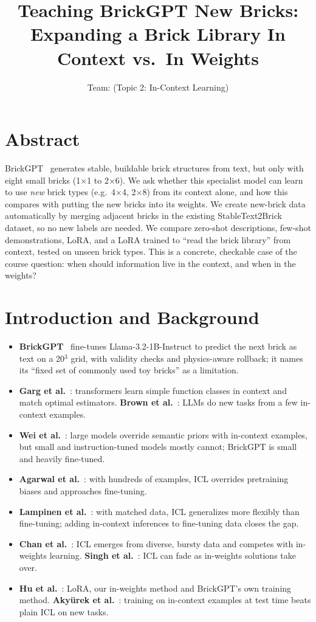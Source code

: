 \documentclass[12pt]{article}
\title{\vspace{-2cm}Teaching BrickGPT New Bricks: Expanding a Brick Library In Context vs.\ In Weights\vspace{-0.5cm}}
\author{Team: \todo{[Name 1], [Name 2], [Name 3], [Name 4]} \quad (Topic 2: In-Context Learning)}
\date{\vspace{-1.2cm}}
\begin{document}
\maketitle

\section*{Abstract}
BrickGPT~\cite{pun2025brickgpt} generates stable, buildable brick structures from text, but only with eight small bricks (1$\times$1 to 2$\times$6).
We ask whether this specialist model can learn to use \emph{new} brick types (e.g.\ 4$\times$4, 2$\times$8) from its context alone, and how this compares with putting the new bricks into its weights.
We create new-brick data automatically by merging adjacent bricks in the existing StableText2Brick dataset, so no new labels are needed.
We compare zero-shot descriptions, few-shot demonstrations, LoRA, and a LoRA trained to ``read the brick library'' from context, tested on unseen brick types.
This is a concrete, checkable case of the course question: when should information live in the context, and when in the weights?

\section*{Introduction and Background}
\begin{itemize}
\item \textbf{BrickGPT}~\cite{pun2025brickgpt} fine-tunes Llama-3.2-1B-Instruct to predict the next brick as text on a 20$^3$ grid, with validity checks and physics-aware rollback; it names its ``fixed set of commonly used toy bricks'' as a limitation.
\item \textbf{Garg et al.}~\cite{garg2022can}: transformers learn simple function classes in context and match optimal estimators. \textbf{Brown et al.}~\cite{brown2020gpt3}: LLMs do new tasks from a few in-context examples.
\item \textbf{Wei et al.}~\cite{wei2023larger}: large models override semantic priors with in-context examples, but small and instruction-tuned models mostly cannot; BrickGPT is small and heavily fine-tuned.
\item \textbf{Agarwal et al.}~\cite{agarwal2024manyshot}: with hundreds of examples, ICL overrides pretraining biases and approaches fine-tuning.
\item \textbf{Lampinen et al.}~\cite{lampinen2025generalization}: with matched data, ICL generalizes more flexibly than fine-tuning; adding in-context inferences to fine-tuning data closes the gap.
\item \textbf{Chan et al.}~\cite{chan2022data}: ICL emerges from diverse, bursty data and competes with in-weights learning. \textbf{Singh et al.}~\cite{singh2023transient}: ICL can fade as in-weights solutions take over.
\item \textbf{Hu et al.}~\cite{hu2021lora}: LoRA, our in-weights method and BrickGPT's own training method. \textbf{Aky\"urek et al.}~\cite{akyurek2024ttt}: training on in-context examples at test time beats plain ICL on new tasks.
\end{itemize}
\end{document}
